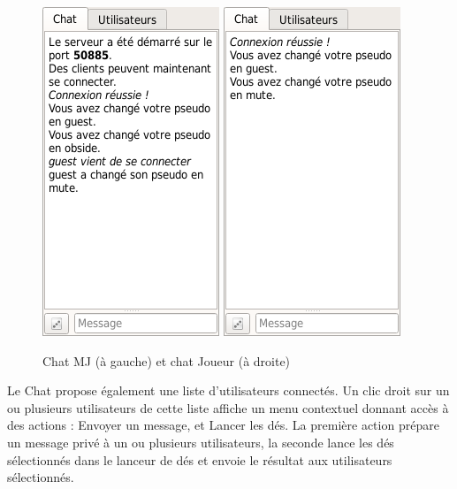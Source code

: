 \begin{figure}[h!]
	\centering
	\includegraphics[scale=0.5]{img/chat_mj.png}
	\hspace{10 mm}
	\includegraphics[scale=0.5]{img/chat_player.png}
	\caption{Chat MJ (à gauche) et chat Joueur (à droite)}
\end{figure}

Le Chat propose également une liste d'utilisateurs connectés. Un clic droit sur un ou plusieurs utilisateurs de cette liste affiche un menu contextuel donnant accès à des actions : Envoyer un message, et Lancer les dés.
La première action prépare un message privé à un ou plusieurs utilisateurs, la seconde lance les dés sélectionnés dans le lanceur de dés et envoie le résultat aux utilisateurs sélectionnés.


